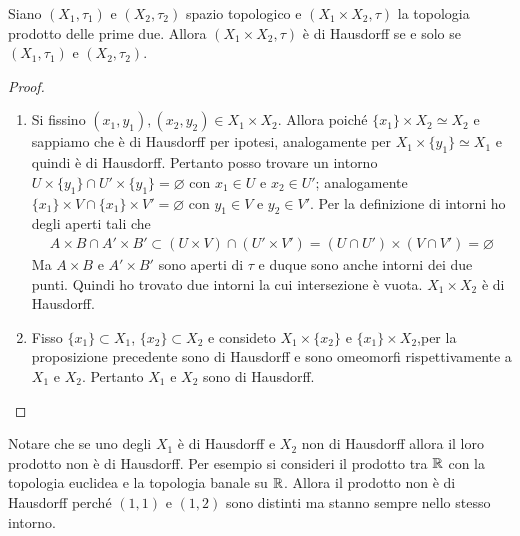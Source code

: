 \begin{theorem}
	Siano $(X_1, \tau_1)$ e $(X_2, \tau_2)$ spazio topologico e $(X_1 \times X_2, \tau)$ la topologia prodotto delle prime due. Allora $(X_1 \times X_2, \tau)$ è di Hausdorff se e solo se $(X_1, \tau_1)$ e $(X_2, \tau_2)$.
\end{theorem} 
\begin{proof}
	\begin{enumerate}
		\item Si fissino $(x_1, y_1), (x_2, y_2) \in X_1 \times X_2$. Allora poiché $\{x_1\} \times X_2 \simeq X_2$ e sappiamo che è di Hausdorff per ipotesi, analogamente per $X_1 \times \{y_1\} \simeq X_1$ e quindi è di Hausdorff. Pertanto posso trovare un intorno $U \times \{y_1\} \cap U' \times \{y_1\} = \varnothing$ con $x_1 \in U$ e $x_2 \in U'$; analogamente $\{x_1\} \times V \cap \{x_1\} \times V' = \varnothing$ con $y_1 \in V$ e $y_2 \in V'$. Per la definizione di intorni ho degli aperti tali che 
		\begin{equation}
		\begin{aligned}
		A \times B \cap A' \times B' \subset (U \times V) \cap (U' \times V') = (U \cap U') \times (V \cap V') = \varnothing
		\end{aligned}
		\end{equation}
		Ma $A \times B$ e $A' \times B'$ sono aperti di $\tau$ e duque sono anche intorni dei due punti. Quindi ho trovato due intorni la cui intersezione è vuota. $X_1 \times X_2$ è di Hausdorff.
		\item Fisso $\{x_1\} \subset X_1$, $\{x_2\} \subset X_2$ e consideto $X_1 \times \{x_2\}$ e $\{x_1\} \times X_2$,per la proposizione precedente sono di Hausdorff e sono omeomorfi rispettivamente a $X_1$ e $X_2$. Pertanto $X_1$ e $X_2$ sono di Hausdorff.
	\end{enumerate}
\end{proof}

\begin{remark}
	Notare che se uno degli $X_1$ è di Hausdorff e $X_2$ non di Hausdorff allora il loro prodotto non è di Hausdorff. Per esempio si consideri il prodotto tra $\mathbb{R}$ con la topologia euclidea e la topologia banale su $\mathbb{R}$. Allora il prodotto non è di Hausdorff perché $(1,1)$ e $(1,2)$ sono distinti ma stanno sempre nello stesso intorno. 
	
\end{remark} 


